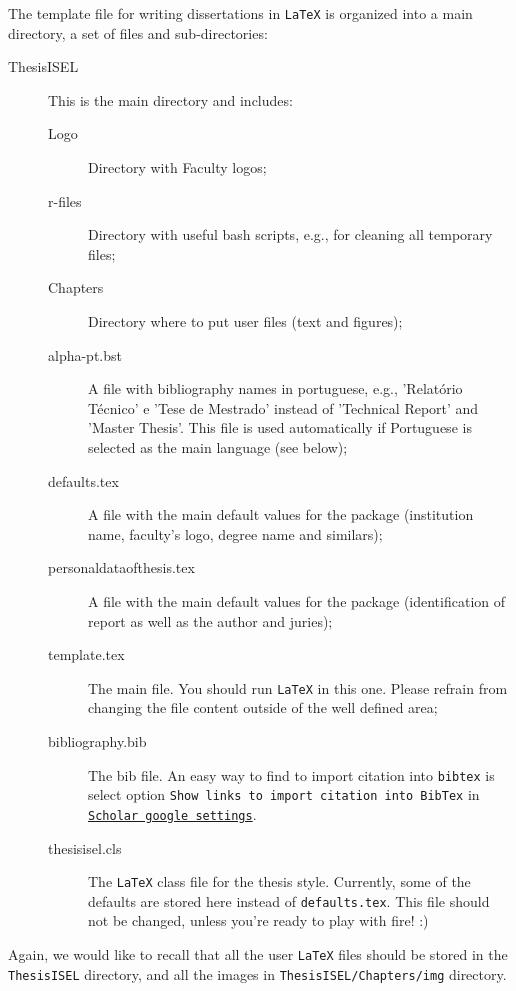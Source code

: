 The template file for writing dissertations in  \texttt{LaTeX} is organized into a main directory, a set of files and sub-directories:
\begin{description}
	\item[ThesisISEL] This is the main directory and includes:
	\begin{description}
		\item[Logo] Directory with Faculty logos;
		\item[r-files] Directory with useful bash scripts, e.g., for cleaning all temporary files;
		\item[Chapters] Directory where to put user files (text and figures);
		\item[alpha-pt.bst] A file with bibliography names in portuguese, e.g., 'Relatório Técnico' e 'Tese de Mestrado' instead of 'Technical Report' and 'Master Thesis'. This file is used automatically if Portuguese is selected as the main language (see below);
		\item[defaults.tex] A file with the main default values for the package (institution name, faculty's logo, degree name and similars);
		\item[personaldataofthesis.tex] A file with the main default values for the package (identification of report as well as the author and juries);
		\item[template.tex] The main file. You should run  \texttt{LaTeX} in this one. Please refrain from changing the file content outside of the well defined area;
		\item[bibliography.bib] The bib file. An easy way to find to import citation into \texttt{bibtex} is select option \texttt{Show links to import citation into \texttt{BibTex}} in \href{http://scholar.google.pt/scholar_settings?hl=en&as_sdt=0,5}{\texttt{Scholar google settings}}.
		\item[thesisisel.cls] The  \texttt{LaTeX} class file for the thesis{} style. Currently, some of the defaults are stored here instead of \verb!defaults.tex!. This file should not be changed, unless you're ready to play with fire! :)
	\end{description}
\end{description}

Again, we would like to recall that all the user \texttt{LaTeX} files should be stored in the \verb!ThesisISEL! directory, and all the images in \verb!ThesisISEL/Chapters/img! directory.

